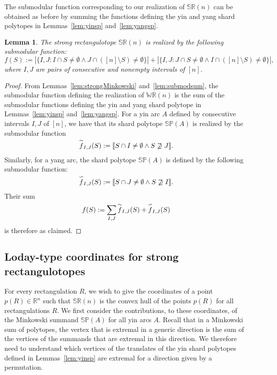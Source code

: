 \documentclass{amsart}
\newtheorem{lemma}[theorem]{Lemma}
\theoremstyle{definition}
\newcommand{\R}{\mathbb{R}} %
\newcommand{\jean}[2][]{\todo[size=\scriptsize, color=orange!30,#1]{\rm #2 \\ \hfill --- J.}}
\newcommand{\polytope}[1]{\mathds{#1}} %
\newcommand{\WRP}{\polytope{WR}} %
\newcommand{\SRP}{\polytope{SR}} %
\newcommand{\SP}{\polytope{SP}}
\newcommand{\yang}[1]{\smash{\overset{\backsim}{#1}}}
\newcommand{\yin}[1]{\smash{\overset{\sim}{#1}}}
\begin{document}
\jean{That seems to work.}

The submodular function corresponding to our realization of $\SRP(n)$ can be obtained as before by summing the functions defining the yin and yang shard polytopes in Lemmas~\ref{lem:yinsp} and~\ref{lem:yangsp}.

\begin{lemma}
  The strong rectangulotope $\SRP(n)$ is realized by the following submodular function:
  \[
  f(S) := |\{ I, J : I\cap S\not=\emptyset \wedge J\cap ([n]\setminus S) \not= \emptyset \}| +
  |\{ I, J : J\cap S\not=\emptyset \wedge I\cap ([n]\setminus S) \not= \emptyset \}|,
  \]
  where $I, J$ are pairs of consecutive and nonempty intervals of $[n]$.
\end{lemma}

\begin{proof}
  From Lemmas~\ref{lem:strongMinkowski} and~\ref{lem:submodsum}, the submodular function defining the realization of $\WRP(n)$ is the sum of the submodular functions defining the yin and yang shard polytope in Lemmas~\ref{lem:yinsp} and~\ref{lem:yangsp}. For a yin arc $A$ defined by consecutive intervals $I, J$ of $[n]$, we have that its shard polytope $\SP(A)$ is realized by the submodular function
  \[
  \yin{f}_{I,J}(S) := \llbracket S\cap I\not=\emptyset \wedge S\not\supseteq J \rrbracket .
  \]
  Similarly, for a yang arc, the shard polytope $\SP(A)$ is defined by the following submodular function:
  \[
  \yang{f}_{I,J}(S) := \llbracket S\cap J\not=\emptyset \wedge S\not\supseteq I \rrbracket .
  \]
  Their sum
  \[
  f(S) := \sum_{I,J} \yin{f}_{I,J}(S) + \yang{f}_{I,J}(S)
  \]
  is therefore as claimed.
\end{proof}

\subsection{Loday-type coordinates for strong rectangulotopes}

For every rectangulation $R$, we wish to give the coordinates of a point $p(R)\in\R^n$ such that $\SRP(n)$ is the convex hull of the points $p(R)$ for all rectangulations $R$.
We first consider the contributions, to these coordinates, of the Minkowski summand $\SP(A)$ for all yin arcs $A$.
Recall that in a Minkowski sum of polytopes, the vertex that is extremal in a generic direction is the sum of the vertices of the summands that are extremal in this direction.
We therefore need to understand which vertices of the translates of the yin shard polytopes defined in Lemmas~\ref{lem:yinsp} are extremal for a direction given by a permutation.
\end{document}
